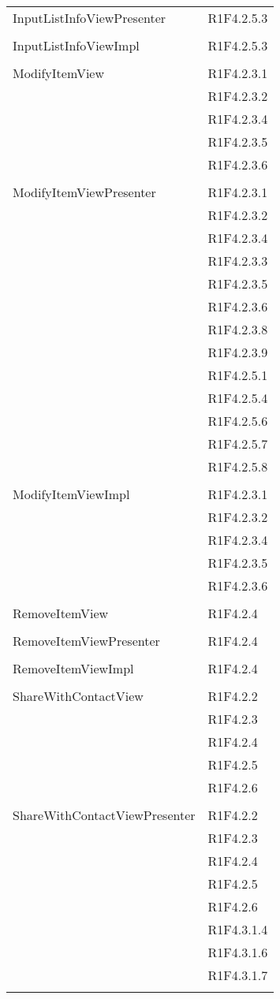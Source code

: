 \begin{center}
\begin{longtable}{|p{7cm}|p{5cm}|}
		InputListInfoViewPresenter & R1F4.2.5.3 \\ & \\ \hline
		InputListInfoViewImpl & R1F4.2.5.3 \\ & \\ \hline
		ModifyItemView & R1F4.2.3.1 \\ & R1F4.2.3.2 \\ & R1F4.2.3.4 \\ & R1F4.2.3.5 \\ & R1F4.2.3.6 \\ & \\ \hline
		ModifyItemViewPresenter & R1F4.2.3.1 \\ & R1F4.2.3.2 \\ & R1F4.2.3.4 \\ & R1F4.2.3.3 \\ & R1F4.2.3.5 \\ & R1F4.2.3.6 \\ & R1F4.2.3.8 \\ & R1F4.2.3.9 \\ & R1F4.2.5.1 \\ & R1F4.2.5.4 \\ & R1F4.2.5.6 \\ & R1F4.2.5.7 \\ & R1F4.2.5.8 \\ & \\ \hline
		ModifyItemViewImpl & R1F4.2.3.1 \\ & R1F4.2.3.2 \\ & R1F4.2.3.4 \\ & R1F4.2.3.5 \\ & R1F4.2.3.6 \\ & \\ \hline
		RemoveItemView & R1F4.2.4 \\ & \\ \hline
		RemoveItemViewPresenter & R1F4.2.4 \\ & \\ \hline
		RemoveItemViewImpl & R1F4.2.4 \\ & \\ \hline
		ShareWithContactView & R1F4.2.2 \\ & R1F4.2.3 \\ & R1F4.2.4 \\ & R1F4.2.5 \\ & R1F4.2.6 \\ & \\ \hline
		ShareWithContactViewPresenter & R1F4.2.2 \\ & R1F4.2.3 \\ & R1F4.2.4 \\ & R1F4.2.5 \\ & R1F4.2.6 \\ & R1F4.3.1.4 \\ & R1F4.3.1.6 \\ & R1F4.3.1.7 \\ & \\ \hline

\end{longtable}
\end{center}
